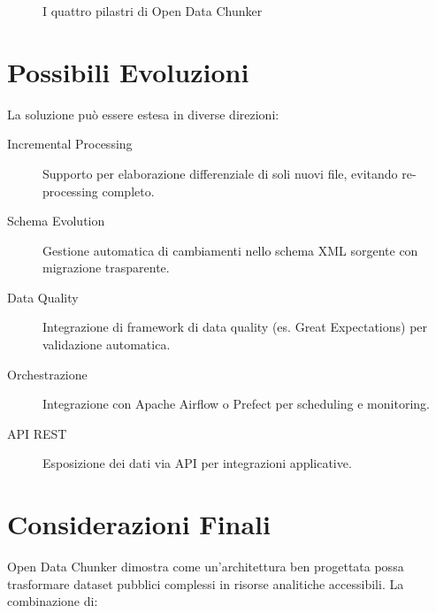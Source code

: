 \begin{figure}[h]
\centering
{}
\caption{I quattro pilastri di Open Data Chunker}
\end{figure}

\section{Possibili Evoluzioni}

La soluzione può essere estesa in diverse direzioni:

\begin{description}
    \item[Incremental Processing] Supporto per elaborazione differenziale di soli nuovi file, evitando re-processing completo.
    
    \item[Schema Evolution] Gestione automatica di cambiamenti nello schema XML sorgente con migrazione trasparente.
    
    \item[Data Quality] Integrazione di framework di data quality (es. Great Expectations) per validazione automatica.
    
    \item[Orchestrazione] Integrazione con Apache Airflow o Prefect per scheduling e monitoring.
    
    \item[API REST] Esposizione dei dati via API per integrazioni applicative.
\end{description}

\section{Considerazioni Finali}

Open Data Chunker dimostra come un'architettura ben progettata possa trasformare dataset pubblici complessi in risorse analitiche accessibili. La combinazione di:

